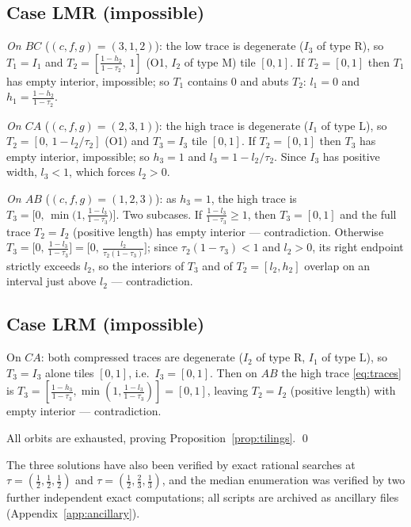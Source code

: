 \documentclass{aims}
\numberwithin{equation}{section}
\theoremstyle{plain}
\theoremstyle{definition}
\theoremstyle{remark}
\begin{document}
\subsection*{Case LMR \textup(impossible\textup)}
\emph{On $BC$} ($(c,f,g)=(3,1,2)$): the low trace is degenerate ($I_3$ of type
$\mathrm R$), so $T_1=I_1$ and $T_2=[\tfrac{1-h_2}{1-\tau_2},\,1]$ (O1, $I_2$
of type $\mathrm M$) tile $[0,1]$. If $T_2=[0,1]$ then $T_1$ has empty
interior, impossible; so $T_1$ contains $0$ and abuts $T_2$: $l_1=0$ and
$h_1=\tfrac{1-h_2}{1-\tau_2}$.

\emph{On $CA$} ($(c,f,g)=(2,3,1)$): the high trace is degenerate ($I_1$ of type
$\mathrm L$), so $T_2=[0,\,1-l_2/\tau_2]$ (O1) and $T_3=I_3$ tile $[0,1]$. If
$T_2=[0,1]$ then $T_3$ has empty interior, impossible; so $h_3=1$ and
$l_3=1-l_2/\tau_2$. Since $I_3$ has positive width, $l_3<1$, which forces
$l_2>0$.

\emph{On $AB$} ($(c,f,g)=(1,2,3)$): as $h_3=1$, the high trace is
$T_3=\bigl[0,\,\min\bigl(1,\tfrac{1-l_3}{1-\tau_3}\bigr)\bigr]$. Two subcases.
If $\tfrac{1-l_3}{1-\tau_3}\ge1$, then $T_3=[0,1]$ and the full trace
$T_2=I_2$ (positive length) has empty interior --- contradiction. Otherwise
$T_3=\bigl[0,\,\tfrac{1-l_3}{1-\tau_3}\bigr]
=\bigl[0,\,\tfrac{l_2}{\tau_2(1-\tau_3)}\bigr]$; since $\tau_2(1-\tau_3)<1$
and $l_2>0$, its right endpoint strictly exceeds $l_2$, so the interiors of
$T_3$ and of $T_2=[l_2,h_2]$ overlap on an interval just above $l_2$ ---
contradiction.

\subsection*{Case LRM \textup(impossible\textup)}
On $CA$: both compressed traces are degenerate ($I_2$ of type $\mathrm R$,
$I_1$ of type $\mathrm L$), so $T_3=I_3$ alone tiles $[0,1]$, i.e.\
$I_3=[0,1]$. Then on $AB$ the high trace \eqref{eq:traces} is
$T_3=[\tfrac{1-h_3}{1-\tau_3},\min(1,\tfrac{1-l_3}{1-\tau_3})]=[0,1]$, leaving
$T_2=I_2$ (positive length) with empty interior --- contradiction.

\medskip
All orbits are exhausted, proving Proposition~\ref{prop:tilings}. \qed

\medskip
The three solutions have also been verified by exact rational searches at
$\tau=(\tfrac12,\tfrac12,\tfrac12)$ and $\tau=(\tfrac12,\tfrac23,\tfrac13)$,
and the median enumeration was verified by two further independent exact
computations; all scripts are archived as ancillary files
(Appendix~\ref{app:ancillary}).
\end{document}
